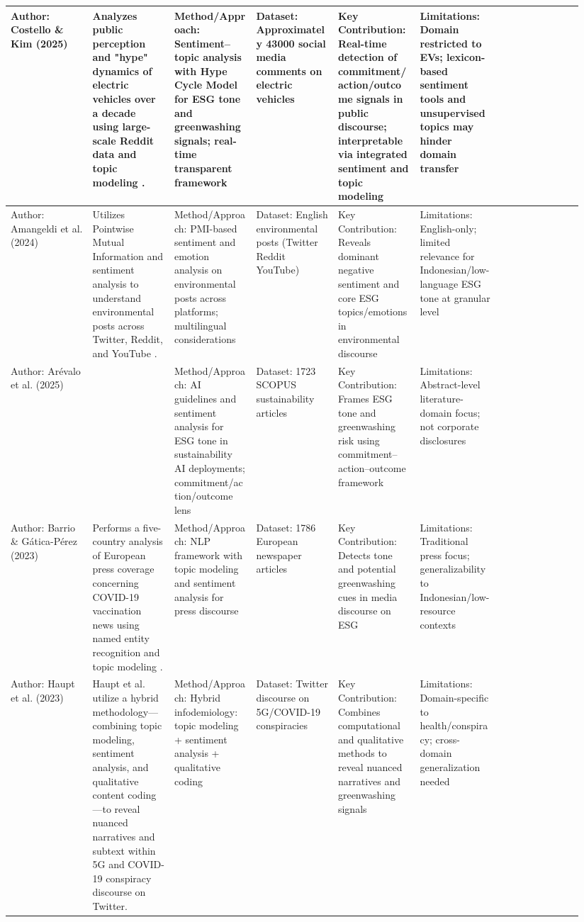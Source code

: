 \documentclass{article}
\begin{document}
\begin{landscape}
\begin{longtable}{p{0.134\linewidth} p{0.134\linewidth} p{0.134\linewidth} p{0.134\linewidth} p{0.134\linewidth} p{0.134\linewidth} p{0.134\linewidth}}
Author: Costello \& Kim (2025) & Analyzes public perception and "hype" dynamics of electric vehicles over a decade using large-scale Reddit data and topic modeling  \parencite{tao_ruan_824a9480}. & Method/Approach: Sentiment–topic analysis with Hype Cycle Model for ESG tone and greenwashing signals; real-time transparent framework & Dataset: Approximately 43000 social media comments on electric vehicles & Key Contribution: Real-time detection of commitment/action/outcome signals in public discourse; interpretable via integrated sentiment and topic modeling & Limitations: Domain restricted to EVs; lexicon-based sentiment tools and unsupervised topics may hinder domain transfer & ~ \\ \hline
Author: Amangeldi et al. (2024) & Utilizes Pointwise Mutual Information and sentiment analysis to understand environmental posts across Twitter, Reddit, and YouTube  \parencite{daniyar_amangeldi_dfc2f315}. & Method/Approach: PMI-based sentiment and emotion analysis on environmental posts across platforms; multilingual considerations & Dataset: English environmental posts (Twitter Reddit YouTube) & Key Contribution: Reveals dominant negative sentiment and core ESG topics/emotions in environmental discourse & Limitations: English-only; limited relevance for Indonesian/low-language ESG tone at granular level & ~ \\ \hline
Author: Arévalo et al. (2025) & ~ & Method/Approach: AI guidelines and sentiment analysis for ESG tone in sustainability AI deployments; commitment/action/outcome lens & Dataset: 1723 SCOPUS sustainability articles & Key Contribution: Frames ESG tone and greenwashing risk using commitment–action–outcome framework & Limitations: Abstract-level literature-domain focus; not corporate disclosures & ~ \\ \hline
Author: Barrio \& Gática-Pérez (2023) & Performs a five-country analysis of European press coverage concerning COVID-19 vaccination news using named entity recognition and topic modeling  \parencite{david_alonso_del_barrio_725eba22}. & Method/Approach: NLP framework with topic modeling and sentiment analysis for press discourse & Dataset: 1786 European newspaper articles & Key Contribution: Detects tone and potential greenwashing cues in media discourse on ESG & Limitations: Traditional press focus; generalizability to Indonesian/low-resource contexts & ~ \\ \hline
Author: Haupt et al. (2023) & Haupt et al.  \parencite{michael_robert_haupt_ccbbb1b9} utilize a hybrid methodology—combining topic modeling, sentiment analysis, and qualitative content coding—to reveal nuanced narratives and subtext within 5G and COVID-19 conspiracy discourse on Twitter. & Method/Approach: Hybrid infodemiology: topic modeling + sentiment analysis + qualitative coding & Dataset: Twitter discourse on 5G/COVID-19 conspiracies & Key Contribution: Combines computational and qualitative methods to reveal nuanced narratives and greenwashing signals & Limitations: Domain-specific to health/conspiracy; cross-domain generalization needed & ~ \\ \hline

\end{longtable}
\end{landscape}
\end{document}
